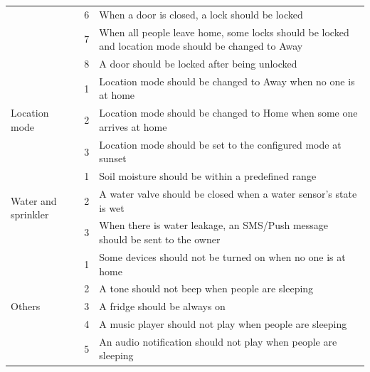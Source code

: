 \begin{table}[tb]
{{\begin{tabular}{| p{1.9cm} | p{0.5cm} | p{11.5cm} |}
& 6 & When a door is closed, a lock should be locked\\ \cline{2-3}
& 7 & When all people leave home, some locks should be locked and location mode should be changed to Away\\ \cline{2-3}
& 8 & A door should be locked after being unlocked\\ \cline{2-3}
\hline
\multirow{3}{1.9cm}{Location mode} & 1 & Location mode should be changed to Away when no one is at home\\ \cline{2-3}
 & 2 & Location mode should be changed to Home when some one arrives at home\\ \cline{2-3}
 & 3 & Location mode should be set to the configured mode at sunset\\ \cline{2-3}
\hline
\multirow{3}{1.9cm}{Water and sprinkler} & 1 & Soil moisture should be within a predefined range\\ \cline{2-3}
& 2 & A water valve should be closed when a water sensor's state is wet\\ \cline{2-3}
& 3 & When there is water leakage, an SMS/Push message should be sent to the owner\\ \cline{2-3}
\hline
\multirow{5}{1.9cm}{Others} & 1 & Some devices should not be turned on when no one is at home\\ \cline{2-3}
& 2 & A tone should not beep when people are sleeping\\ \cline{2-3}
& 3 & A fridge should be always on\\ \cline{2-3}
& 4 & A music player should not play when people are sleeping\\ \cline{2-3}
& 5 & An audio notification should not play when people are sleeping\\ \cline{2-3}
\hline
\end{tabular}}
}
\end{table}

